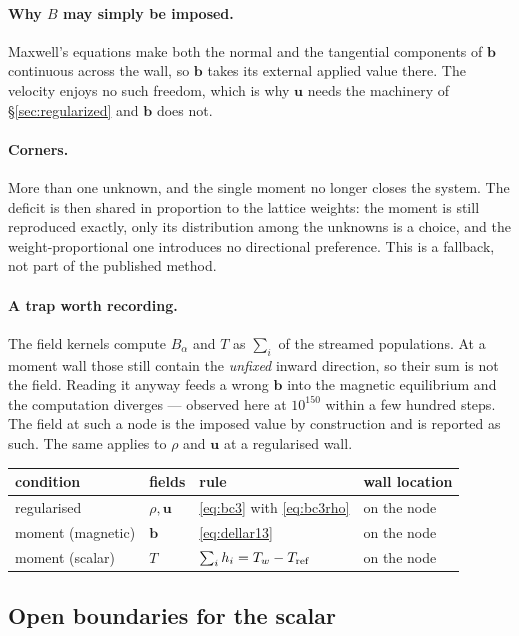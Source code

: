 \documentclass[11pt,a4paper]{article}
\newcommand{\uu}{\bm{u}}
\newcommand{\bb}{\bm{b}}
\begin{document}
\paragraph{Why $B$ may simply be imposed.} Maxwell's equations make both the
normal and the tangential components of $\bb$ continuous across the wall, so
$\bb$ takes its external applied value there. The velocity enjoys no such
freedom, which is why $\uu$ needs the machinery of \S\ref{sec:regularized} and
$\bb$ does not.

\paragraph{Corners.} More than one unknown, and the single moment no longer
closes the system. The deficit is then shared in proportion to the lattice
weights: the moment is still reproduced exactly, only its distribution among the
unknowns is a choice, and the weight-proportional one introduces no directional
preference. This is a fallback, not part of the published method.

\paragraph{A trap worth recording.} The field kernels compute $B_\alpha$ and $T$
as $\sum_i$ of the streamed populations. At a moment wall those still contain the
\emph{unfixed} inward direction, so their sum is not the field. Reading it
anyway feeds a wrong $\bb$ into the magnetic equilibrium and the computation
diverges --- observed here at $10^{150}$ within a few hundred steps. The field at
such a node is the imposed value by construction and is reported as such. The
same applies to $\rho$ and $\uu$ at a regularised wall.

\begin{center}\small
\begin{tabular}{llll}
\toprule
condition & fields & rule & wall location \\
\midrule
regularised   & $\rho,\uu$ & \eqref{eq:bc3} with \eqref{eq:bc3rho} & on the node \\
moment (magnetic) & $\bb$ & \eqref{eq:dellar13} & on the node \\
moment (scalar)   & $T$   & $\sum_i h_i = T_w - T_{\rm ref}$ & on the node \\
\bottomrule
\end{tabular}
\end{center}

\subsection{Open boundaries for the scalar}
\label{sec:scalaroutflow}
\end{document}
